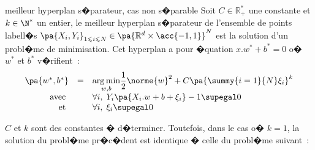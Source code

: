             \begin{xproblem}{meilleur hyperplan s�parateur, cas non s�parable}\label{svm_problem_def_2}
            Soit $C \in \mathbb{R}^*_+$ une constante et $k \in \N^*$ un entier,
            le meilleur hyperplan s�parateur de l'ensemble de points labell�s
            $\pa{X_i,Y_i}_{1 \leqslant i \leqslant N} \in \pa{ \mathbb{R}^d \times \acc{-1,1} }^N$ est la solution
            d'un probl�me de minimisation. Cet hyperplan a pour �quation $x.w^* + b^* = 0$ o� 
            $w^*$ et $b^*$ v�rifient~:
                    $$
                    \begin{array}{rcl}    \pa{w^*,b^*} &=& \underset{w,b}{\arg \min} \dfrac{1}{2} \norme{w}^2 + 
                                                                                                C \pa{\summy{i=1}{N} \xi_i}^k \\
                                         \text{avec }      && \forall i, \; Y_i \pa{ X_i .w + b + \xi_i } - 1 \supegal 0 \\
                                         \text{et }            && \forall i, \; \xi_i \supegal 0 
                    \end{array}                                        
                    $$
            \end{xproblem}

$C$ et $k$ sont des constantes � d�terminer. Toutefois, dans le cas o� $k = 1$, la solution du probl�me pr�c�dent est identique � celle du probl�me suivant~:


